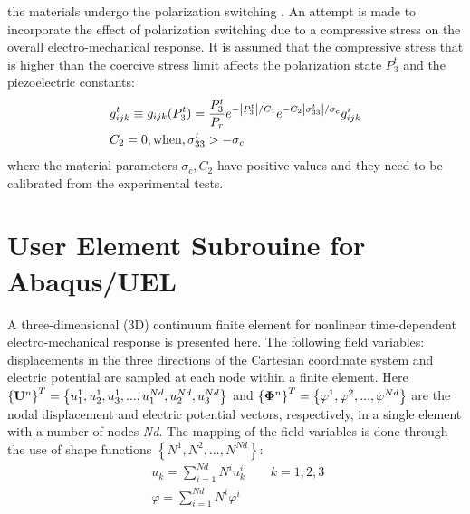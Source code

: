  the materials undergo the polarization switching \cite{Li2004959}. 
An attempt is made to incorporate the effect of polarization switching due to a compressive stress on the overall electro-mechanical response. 
It is assumed that the compressive stress that is higher than the coercive stress limit affects the polarization state $P^t_3$ and the piezoelectric constants:
\begin{equation}
\begin{aligned}
& g_{ijk}^t \equiv {g_{ijk}}(P_3^t) = \frac{{P_3^t}}{{{P_r}}}{e^{ - \left| {P_3^t} \right|/{C_1}}}{e^{ - {C_2}\left| {\sigma _{33}^t} \right|/{\sigma _c}}}g_{ijk}^r\\
& {C_2} = 0, {\rm{ when }}, \sigma _{33}^t >  - {\sigma _c}
\end{aligned}
\label{EQN:Effect_of_tensile_stress_on_piezo_constants}
\end{equation} 
where the material parameters $\sigma_c, C_2$ have positive values and they need to be calibrated from the experimental tests.

\section{User Element Subrouine for Abaqus/UEL}
A three-dimensional (3D) continuum finite element for nonlinear time-dependent electro-mechanical response is presented here. 
The following field variables: displacements in the three directions of the Cartesian coordinate system and electric potential are sampled at each node within a finite element.
Here ${\left\{ {{{\bf{U}}^n}} \right\}^T} = \left\{ {u_1^1,u_2^1,u_3^1,...,u_1^{Nd},u_2^{Nd},u_3^{Nd}} \right\}$ and ${\left\{ {{{\bf{\Phi }}^n}} \right\}^T} = \left\{ {{\varphi ^1},{\varphi ^2},...,{\varphi ^{Nd}}} \right\}$ are the nodal displacement and electric potential vectors,
 respectively, in a single element with a number of nodes \textit{Nd}. 
 The mapping of the field variables is done through the use of shape functions $\left\{ {{N^1},{N^2},...,{N^{Nd}}} \right\}$:
\begin{equation}
\begin{aligned}
&{u_k} = \sum\limits_{i = 1}^{Nd} {{N^i}u_k^i} \begin{array}{*{20}{c}}
{}&{}&{k = 1,2,3}
\end{array}\\
&\varphi  = \sum\limits_{i = 1}^{Nd} {{N^i}\varphi _{}^i} 
\end{aligned}
\label{EQN:FEM_uel_shape_funtions}
\end{equation} 


